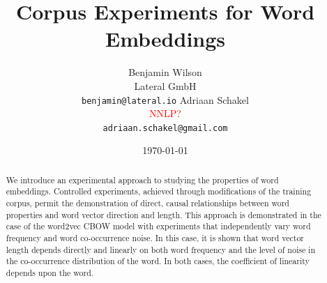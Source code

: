 \documentclass{article} %
\title{Corpus Experiments for Word Embeddings}
\author{
 	Benjamin Wilson\\
	Lateral GmbH\\
	\texttt{benjamin@lateral.io}
	\And
	Adriaan Schakel\\
	\textcolor{red}{NNLP?}\\
	\texttt{adriaan.schakel@gmail.com}
 }
\date{\today}
\begin{document}
\graphicspath{{../outputs/}}
\maketitle


\begin{abstract}
	We introduce an experimental approach to studying the properties of word embeddings.
	Controlled experiments, achieved through modifications of the training corpus, permit the demonstration of direct, causal relationships between word properties and word vector direction and length.
	This approach is demonstrated in the case of the word2vec CBOW model with experiments that independently vary word frequency and word co-occurrence noise.
	In this case, it is shown that word vector length depends directly and linearly on both word frequency and the level of noise in the co-occurrence distribution of the word.
	In both cases, the coefficient of linearity depends upon the word.
\end{abstract} 
\end{document}
